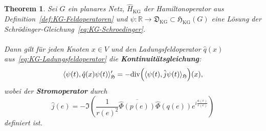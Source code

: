 \documentclass[11pt,a4paper,leqno]{report}
\newtheorem{theorem}{Theorem}[chapter]
\numberwithin{equation}{chapter}
\begin{document}
\begin{theorem}\label{thm:KG-QM-Kontinuitaet}
	Sei $G$ ein planares Netz, $\hat{H}_{\mathrm{KG}}$ der Hamiltonoperator aus Definition~\ref{def:KG-Feldoperatoren} und $\psi:\mathbb{R}\to\mathfrak{D}_{\mathrm{KG}}\subset\mathfrak{H}_{\mathrm{KG}}(G)$ eine Lösung der Schrödinger-Gleichung~\eqref{eq:KG-Schroedinger}.
	\\
	\\
	Dann gilt für jeden Knoten $x\in V$ und den Ladungsfeldoperator $\hat{q}(x)$ aus~\eqref{eq:KG-Ladungsfeldoperator} die \textbf{Kontinuitätsgleichung}:
	\begin{equation}\label{eq:KG-QM-Kontinuitaet}
		\langle \psi(t), \hat{q}(x) \psi(t) \rangle_{\mathfrak{H}}^\prime = -\mathrm{div}\Bigl( \langle \psi(t), \hat{j} \psi(t) \rangle_{\mathfrak{H}} \Bigr)(x),
	\end{equation}
	wobei der \textbf{Stromoperator} durch
	\begin{equation}\label{eq:KG-Stromoperator}
		\hat{j}(e) = -\Im\left( \frac{1}{r(e)^2} \overline{\hat{\Phi}(p(e))} \hat{\Phi}(q(e)) e^{i\frac{a(e)}{r(e)}} \right)
	\end{equation}
	definiert ist.
\end{theorem}
\end{document}
